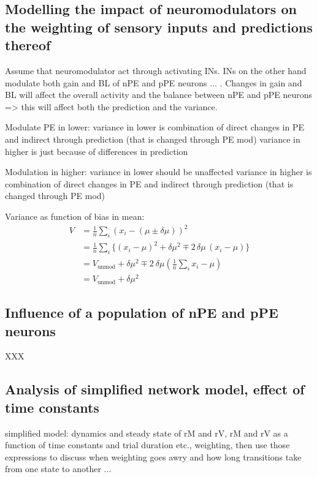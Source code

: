 \documentclass[10pt,a4paper,draft]{article}
\begin{document}
\subsection*{Modelling the impact of neuromodulators on the weighting of sensory inputs and predictions thereof}

Assume that neuromodulator act through activating INs. INs on the other hand modulate both gain and BL of nPE and pPE neurons ... . Changes in gain and BL will affect the overall activity and the balance between nPE and pPE neurons => this will affect both the prediction and the variance. 

Modulate PE in lower:
variance in lower is combination of direct changes in PE and indirect through prediction (that is changed through PE mod)
variance in higher is just because of differences in prediction


Modulation in higher:
variance in lower should be unaffected
variance in higher is combination of direct changes in PE and indirect through prediction (that is changed through PE mod)

Variance as function of bias in mean:
\begin{align*}
V &= \frac{1}{n} \sum_i \left( x_i - \left(\mu \pm \delta\mu\right)\right)^2 \\
&= \frac{1}{n} \sum_i \lbrace  \left( x_i - \mu \right)^2 + \delta\mu^2 \mp 2\, \delta\mu\,  (x_i - \mu)\rbrace \\
&= V_\mathrm{unmod} + \delta\mu^2 \mp 2\ \delta\mu \left( \frac{1}{n} \sum_i x_i- \mu\right) \\
&= V_\mathrm{unmod} + \delta\mu^2
\end{align*}
%


\subsection*{Influence of a population of nPE and pPE neurons}
XXX


\subsection*{Analysis of simplified network model, effect of time constants}

simplified model: dynamics and steady state of rM and rV, rM and rV as a function of time constants and trial duration etc., weighting, then use those expressions to discuss when weighting goes awry and how long transitions take from one state to another ...
\end{document}
